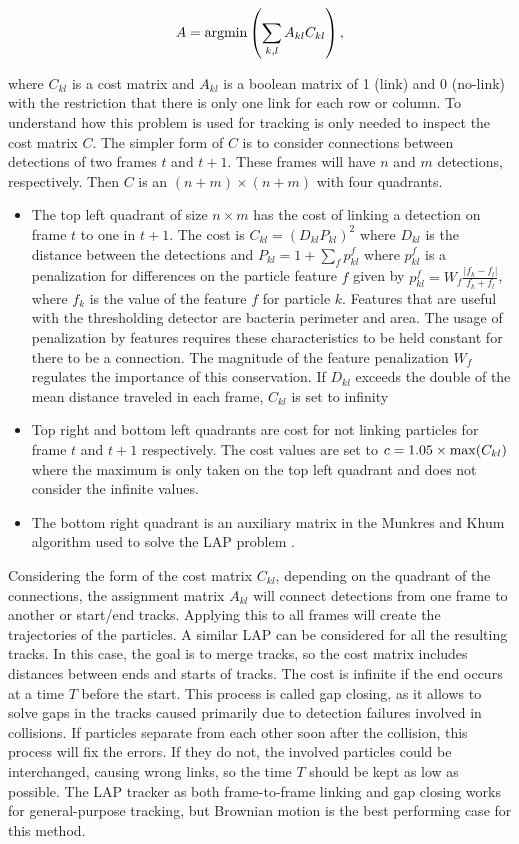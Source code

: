 \begin{equation}
  A = {\rm argmin} \left(  \sum_{k,l} A_{kl}C_{kl} \right),
\end{equation}

where $C_{kl}$ is a cost matrix and $A_{kl}$ is a boolean matrix of 1 (link) and 0 (no-link) with the restriction that there is only one link for each row or column. To understand how this problem is used for tracking is only needed to inspect the cost matrix $C$. The simpler form of $C$ is to consider connections between detections of two frames $t$ and $t+1$. These frames will have $n$ and $m$ detections, respectively. Then $C$ is an $(n+m) \times (n+m)$ with four quadrants. 

\begin{itemize}
	\item The top left quadrant of size $n \times m$ has the cost of linking a detection on frame $t$ to one in $t+1$. The cost is $C_{kl} = (D_{kl}P_{kl})^2$ where $D_{kl}$ is the distance between the detections and $P_{kl} = 1 + \sum_f p_{kl}^f$ where $p_{kl}^f$ is a penalization for differences on the particle feature $f$ given by $p_{kl}^f = W_f \frac{|f_k - f_l|}{f_k + f_l}$, where $f_k$ is the value of the feature $f$ for particle $k$. Features that are useful with the thresholding detector are bacteria perimeter and area. The usage of penalization by features requires these characteristics to be held constant for there to be a connection. The magnitude of the feature penalization $W_f$ regulates the importance of this conservation. If $D_{kl}$ exceeds the double of the mean distance traveled in each frame, $C_{kl}$ is set to infinity
	\item Top right and bottom left quadrants are cost for not linking particles for frame $t$ and $t+1$ respectively. The cost values are set to $c = 1.05 \times {\rm max}(C_{kl})$ where the maximum is only taken on the top left quadrant and does not consider the infinite values.
	\item The bottom right quadrant is an auxiliary matrix in the Munkres and Khum algorithm used to solve the LAP problem \cite{Munkres1957AlgorithmsProblems}.
\end{itemize}

Considering the form of the cost matrix $C_{kl}$, depending on the quadrant of the connections, the assignment matrix $A_{kl}$ will connect detections from one frame to another or start/end tracks. Applying this to all frames will create the trajectories of the particles. A similar LAP can be considered for all the resulting tracks. In this case, the goal is to merge tracks, so the cost matrix includes distances between ends and starts of tracks. The cost is infinite if the end occurs at a time $T$ before the start. This process is called gap closing, as it allows to solve gaps in the tracks caused primarily due to detection failures involved in collisions. If particles separate from each other soon after the collision, this process will fix the errors. If they do not, the involved particles could be interchanged, causing wrong links, so the time $T$ should be kept as low as possible.  The LAP tracker as both frame-to-frame linking and gap closing works for general-purpose tracking, but Brownian motion is the best performing case for this method.

